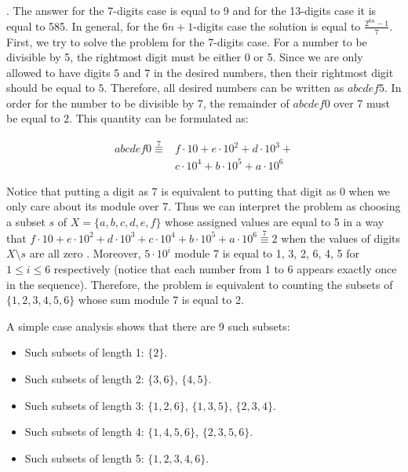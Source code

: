 \begin{solution}.
The answer for the 7-digits case is equal to 9 and for the 13-digits case it is equal to 585. In general, for the $6n+1$-digits case the solution is equal to $\frac{2^{6n}-1}{7}$.\\[0.2cm]

First, we try to solve the problem for the 7-digits case. For a number to be divisible by 5, the rightmost digit must be either 0 or 5. Since we are only allowed to have digits $5$ and $7$ in the desired numbers, then their rightmost digit should be equal to $5$. Therefore, all desired numbers can be written as $abcdef5$. In order for the  number to be divisible by 7, the remainder of $abcdef0$ over 7 must be equal to 2. This quantity can be formulated as:

$$
\begin{aligned}
abcdef0 \overset{7}{\equiv}  &f \cdot 10  + e \cdot 10^2  + d \cdot 10^3 + \\
&c \cdot 10^4  + b \cdot 10^5  + a \cdot 10^6 
\end{aligned}
$$

Notice that putting a digit as 7 is equivalent to putting that digit as 0 when we only care about its module over 7. Thus we can interpret the problem as choosing a subset $s$ of  $X = \{ a, b, c, d, e, f\}$ whose assigned values are equal to 5 in a way that $f \cdot 10  + e \cdot 10^2  + d \cdot 10^3 + 
c \cdot 10^4  + b \cdot 10^5  + a \cdot 10^6 \overset{7}{\equiv} 2$ when the values of digits $X \setminus s$ are all zero . Moreover, $5 \cdot 10^i$ module 7 is equal to 1, 3, 2, 6, 4, 5 for $1 \leq i \leq 6$ respectively (notice that each number from 1 to 6 appears exactly once in the sequence). Therefore, the  problem is equivalent to counting the subsets of $\{1, 2, 3, 4, 5, 6\}$ whose sum module 7 is equal to 2.

A simple case analysis shows that there are 9 such subsets:
\begin{itemize}
	\item Such subsets of length 1: $\{2\}$.
	\item Such subsets of length 2: $\{3,6\}$, $\{4,5\}$.
	\item Such subsets of length 3: $\{1,2,6\}$, $\{1,3,5\}$, $\{2,3,4\}$.
	\item Such subsets of length 4: $\{1,4,5,6\}$, $\{2,3,5,6\}$.
	\item Such subsets of length 5: $\{1,2,3,4,6\}$.
\end{itemize}


\end{solution}
